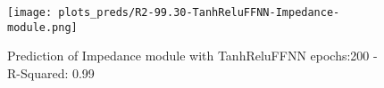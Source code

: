
\begin{figure}[H]
    \centering
    \texttt{[image: plots\_preds/R2-99.30-TanhReluFFNN-Impedance-module.png]}
    \caption{Prediction of Impedance module with TanhReluFFNN epochs:200 - R-Squared: 0.99}
\end{figure}
